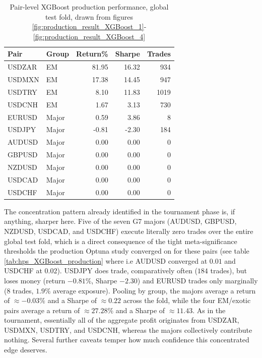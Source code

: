 \documentclass[12pt, a4paper]{article}
\begin{document}
\begin{table}[H]
\centering
\small
\begin{tabular}{ll|rrr}
\toprule
Pair & Group & Return\% & Sharpe & Trades \\
\midrule
USDZAR & EM     & 81.95 & 16.32 & 934 \\
USDMXN & EM     & 17.38 & 14.45 & 947 \\
USDTRY & EM     & 8.10  & 11.83 & 1019 \\
USDCNH & EM     & 1.67  & 3.13  & 730 \\
\midrule
EURUSD & Major  & 0.59  & 3.86  & 8   \\
USDJPY & Major  & -0.81 & -2.30 & 184 \\
AUDUSD & Major  & 0.00  & 0.00  & 0   \\
GBPUSD & Major  & 0.00  & 0.00  & 0   \\
NZDUSD & Major  & 0.00  & 0.00  & 0   \\
USDCAD & Major  & 0.00  & 0.00  & 0   \\
USDCHF & Major  & 0.00  & 0.00  & 0   \\
\bottomrule
\end{tabular}
\caption{Pair-level XGBoost production performance, global test fold, drawn from figures \ref{fig:production_result_XGBoost_1}-\ref{fig:production_result_XGBoost_4}}
\label{tab:pair_level_xgb_production}
\end{table}

The concentration pattern already identified in the tournament phase is, if anything, sharper here. Five of the seven G7 majors (AUDUSD, GBPUSD, NZDUSD, USDCAD, and USDCHF) 
execute literally zero trades over the entire global test fold, which is a direct consequence of the tight meta-significance thresholds the production Optuna study converged on 
for these pairs (see table \ref{tab:hps_XGBoost_production} where i.e AUDUSD converged at $0.01$ and USDCHF at $0.02$). USDJPY does trade, comparatively often ($184$ trades), 
but loses money (return $-0.81\%$, Sharpe $-2.30$) and EURUSD trades only marginally ($8$ trades, $1.9\%$ average exposure). Pooling by group, the majors average a return of 
$\approx -0.03\%$ and a Sharpe of $\approx 0.22$ across the fold, while the four EM/exotic pairs average a return of $\approx 27.28\%$ and a Sharpe of $\approx 11.43$. 
As in the tournament, essentially all of the aggregate profit originates from USDZAR, USDMXN, USDTRY, and USDCNH, whereas the majors collectively contribute nothing.
Several further caveats temper how much confidence this concentrated edge deserves.
\end{document}
